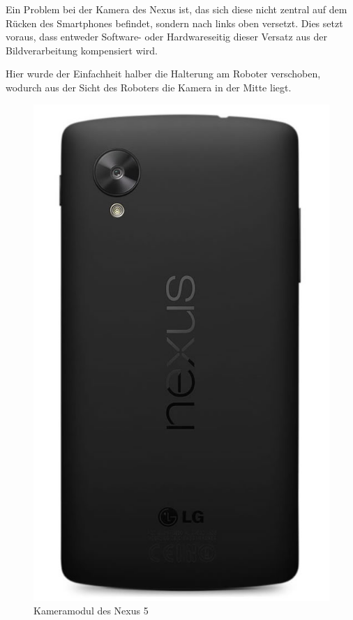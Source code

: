 Ein Problem bei der Kamera des Nexus ist, das sich diese nicht zentral auf dem Rücken des Smartphones befindet, sondern nach links oben versetzt. Dies setzt voraus, dass entweder Software- oder Hardwareseitig dieser Versatz aus der Bildverarbeitung kompensiert wird.

Hier wurde der Einfachheit halber die Halterung am Roboter verschoben, wodurch aus der Sicht des Roboters die Kamera in der Mitte liegt.

\begin{figure}[h]
\centering
\includegraphics[width=\textwidth/3]{Bilder/Robot/nexus_backside}
\caption{Kameramodul des Nexus 5}
\label{fig:camera}
\end{figure}

